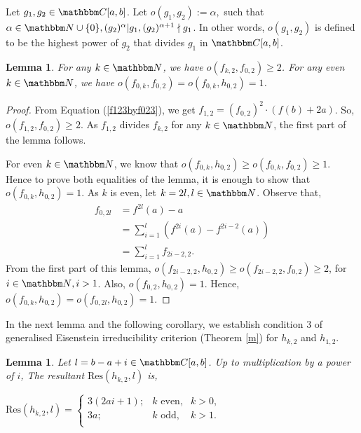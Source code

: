 \documentclass[reqno]{amsart}
\renewcommand{\eqref}[1]{(\ref{#1})}
\numberwithin{equation}{section}
\theoremstyle{plain}
\newtheorem{lemma}[theorem]{Lemma}
\theoremstyle{definition}
\theoremstyle{definition}
\newcommand{\C}{{\mathbbm C}}
\newcommand{\N}{{\mathbbm N}}
\begin{document}
    Let $g_{1},g_{2}\in \C[a,b]$. Let $o(g_{1},g_{2}):=\alpha,$ such that $\alpha\in \N\cup \{0\}, (g_{2})^{\alpha}|g_{1}, (g_{2})^{\alpha + 1}\nmid g_{1}$. In other words, $o(g_{1},g_{2})$ is defined to be the highest power of $g_{2}$ that divides $g_{1}$ in $\C[a,b]$.
    \begin{lemma}\label{divlemma}
        For any $k\in \N$, we have $o(f_{k,2},f_{0,2})\geq 2$. For any even $k\in \N$, we have $o(f_{0,k},f_{0,2})=o(f_{0,k},h_{0,2})=1$.
    \end{lemma}
    \begin{proof}
        From Equation \eqref{f123byf023}, we get $f_{1,2}= (f_{0,2})^{2}\cdot \left(f(b)+2a\right)$. So, $o(f_{1,2},f_{0,2})\geq 2$. As $f_{1,2}$ divides $f_{k,2}$ for any $k\in \N$, the first part of the lemma follows.

        For even $k\in \N$,  we know that $o(f_{0,k},h_{0,2})\geq o(f_{0,k},f_{0,2})\geq 1$. Hence to prove both equalities of the lemma, it is enough to show that $o(f_{0,k},h_{0,2})=1$.
        As $k$ is even, let $k=2l,l\in \N$. Observe that,
        \begin{align*}
            f_{0,2l} & =f^{2l}(a)-a\\
            & =\sum_{i=1}^{l} \left(f^{2i}(a)-f^{2i-2}(a)\right)\\
            & =\sum_{i=1}^{l} f_{2i-2,2}.
        \end{align*}
        From the first part of this lemma, $o(f_{2i-2,2},h_{0,2})\geq o(f_{2i-2,2},f_{0,2})\geq 2$, for $i\in \N, i > 1$. Also, $o(f_{0,2},h_{0,2})=1$. Hence, $o(f_{0,k},h_{0,2})=o(f_{0,2l},h_{0,2})=1$.
    \end{proof}
    In the next lemma and the following corollary, we establish condition $3$ of generalised Eisenstein irreducibility criterion (Theorem \ref{m}) for $h_{k,2}$ and $h_{1,2}$.
    \begin{lemma}\label{k23res}
        Let $l=b-a+i \in \C[a,b]$. Up to multiplication by a power of $i$, The resultant $\mbox{Res}(h_{k,2},l)$ is,
        \begin{center}
            $\mbox{Res}(h_{k,2},l)= \left\{ \begin{array}{rcl}
                3(2ai+1); & k \mbox{ even,} & k>0, \\ 3a; & k \mbox{ odd,} & k>1. \\
            \end{array}\right.$
        \end{center}
    \end{lemma}
\end{document}
